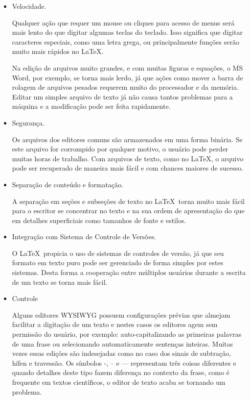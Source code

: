 \begin{itemize}
\item Velocidade.

Qualquer ação que requer um mouse ou cliques para acesso de menus será mais lento do que digitar algumas teclas do teclado. Isso significa que digitar caracteres especiais, como uma letra grega, ou principalmente funções serão muito mais rápidos no \LaTeX.

Na edição de arquivos muito grandes, e com muitas figuras e equações, o MS Word, por exemplo, se torna mais lerdo, já que ações como mover a barra de rolagem de arquivos pesados requerem muito do processador e da memória. Editar um simples arquivo de texto já não causa tantos problemas para a máquina e a modificação pode ser feita rapidamente.

\item Segurança.

Os arquivos dos editores comuns são armazenados em uma forma binária. Se este arquivo for corrompido por qualquer motivo, o usuário pode perder muitas horas de trabalho. Com arquivos de texto, como no \LaTeX, o arquivo pode ser recuperado de maneira mais fácil e com chances maiores de sucesso.

\item Separação de conteúdo e formatação.

A separação em seções e subseções de texto no \LaTeX\ torna muito mais fácil para o escritor se concentrar no texto e na sua ordem de apresentação do que em detalhes superficiais como tamanhos de fonte e estilos.

\item Integração com Sistema de Controle de Versões.

  O \LaTeX\ propicia o uso de sistemas de controles de versão, já que seu formato em texto puro pode ser gerenciado de forma simples por estes sistemas. Desta forma a cooperação entre múltiplos usuários durante a escrita de um texto se torna mais fácil.

\item Controle

Alguns editores WYSIWYG possuem configurações prévias que almejam facilitar a digitação de um texto e nestes casos os editores agem sem permissão do usuário, por exemplo: auto-capitalizando as primeiras palavras de uma frase ou selecionando automaticamente sentenças inteiras. Muitas vezes essas edições são indesejadas como no caso dos sinais de subtração, hífen e travessão. Os símbolos -, -- e --- representam três coisas diferentes e quando detalhes deste tipo fazem diferença no contexto da frase, como é frequente em textos científicos, o editor de texto acaba se tornando um problema.


\end{itemize}
